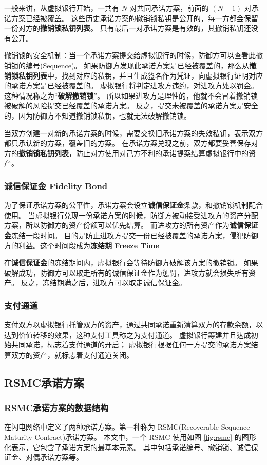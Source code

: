 一般来讲，从虚拟银行开始，一共有 $N$ 对共同承诺方案，前面的 $(N - 1)$ 对承诺方案已经被覆盖。
这些历史承诺方案的撤销锁私钥是公开的，每一方都会保留一份对方的\textbf{撤销锁私钥列表}。
只有最后一对承诺方案是有效的，其撤销私钥还没有公开。

撤销锁的安全机制：当一个承诺方案提交给虚拟银行的时候，防御方可以查看此撤销锁的编号(Sequence)。
如果防御方发现此承诺方案是已经被覆盖的，那么从\textbf{撤销锁私钥列表}中，找到对应的私钥，并且生成签名作为凭证，向虚拟银行证明对应的承诺方案是已经被覆盖的。
虚拟银行将判定进攻方违约，对进攻方处以罚金。
这种情况称之为“\textbf{破解撤销锁}”。
所以如果进攻方是理性的，他就不会冒着撤销锁被破解的风险提交已经覆盖的承诺方案。
反之，提交未被覆盖的承诺方案是安全的，因为防御方不知道撤销锁私钥，也就无法破解撤销锁。

当双方创建一对新的承诺方案的时候，需要交换旧承诺方案的失效私钥，表示双方都只承认新的方案，覆盖旧的方案。
在承诺方案兑现之前，双方都要妥善保存对方的\textbf{撤销锁私钥列表}，防止对方使用对己方不利的承诺提案结算虚拟银行中的资产。

\subsubsection{诚信保证金 Fidelity Bond}
为了保证承诺方案的公平性，承诺方案会设立\textbf{诚信保证金}条款，和撤销锁机制配合使用。
当虚拟银行兑现一份承诺方案的时候，防御方被动接受进攻方的资产分配方案，所以防御方的资产份额可以优先结算。
而进攻方的所有资产作为\textbf{诚信保证金}冻结一段时间。
目的是防止进攻方提交一份已经被覆盖的承诺方案，侵犯防御方的利益。这个时间段成为\textbf{冻结期 Freeze Time}

在\textbf{诚信保证金}的冻结期间内，虚拟银行会等待防御方破解该方案的撤销锁。
如果破解成功，防御方可以取走所有的诚信保证金作为惩罚，进攻方就会损失所有资产。
反之，冻结期满之后，进攻方可以取走诚信保证金。

\subsubsection{支付通道}
支付双方以虚拟银行托管双方的资产，通过共同承诺重新清算双方的存款余额，以达到价值转移的效果，这种支付工具称之为支付通道。
虚拟银行筹建并且达成初始共同承诺，标志着支付通道的开启；
虚拟银行根据任何一方提交的承诺方案结算双方的资产，就标志着支付通道关闭。

\subsection{RSMC承诺方案}
\subsubsection{RSMC承诺方案的数据结构}
在闪电网络中定义了两种承诺方案。第一种称为 RSMC(Recoverable Sequence Maturity Contract)承诺方案。
本文中，一个 RSMC 使用如图 \ref{fig:rsmc} 的图形化表示，它包含了承诺方案的最基本元素。
其中包括承诺编号、撤销锁、诚信保证金、对偶承诺方案等。

